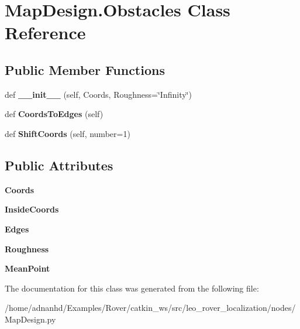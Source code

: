 \hypertarget{classMapDesign_1_1Obstacles}{}\section{Map\+Design.\+Obstacles Class Reference}
\label{classMapDesign_1_1Obstacles}
\subsection*{Public Member Functions}
\begin{DoxyCompactItemize}
\item 
\mbox{\label{classMapDesign_1_1Obstacles_ab1be7e3b82bf7af51c2dfb069f33c824}} 
def {\bfseries \+\_\+\+\_\+init\+\_\+\+\_\+} (self, Coords, Roughness=\char`\"{}Infinity\char`\"{})
\item 
\mbox{\label{classMapDesign_1_1Obstacles_a7d48983e63e4ac175438d21b5e5df722}} 
def {\bfseries Coords\+To\+Edges} (self)
\item 
\mbox{\label{classMapDesign_1_1Obstacles_a62327f4b65d7a5c20b509862ceedd92a}} 
def {\bfseries Shift\+Coords} (self, number=1)
\end{DoxyCompactItemize}
\subsection*{Public Attributes}
\begin{DoxyCompactItemize}
\item 
\mbox{\label{classMapDesign_1_1Obstacles_a7818fce9ea6250a9f319ef99019398cd}} 
{\bfseries Coords}
\item 
\mbox{\label{classMapDesign_1_1Obstacles_aa256d89ec86193cd6257ac407128f130}} 
{\bfseries Inside\+Coords}
\item 
\mbox{\label{classMapDesign_1_1Obstacles_a9ac9628450b43fe32fb70e53590fa160}} 
{\bfseries Edges}
\item 
\mbox{\label{classMapDesign_1_1Obstacles_a10a6682f8b5a18bfe96e4197812b7af4}} 
{\bfseries Roughness}
\item 
\mbox{\label{classMapDesign_1_1Obstacles_a7e8c3de6188ba056265772663bfb7807}} 
{\bfseries Mean\+Point}
\end{DoxyCompactItemize}


The documentation for this class was generated from the following file\+:\begin{DoxyCompactItemize}
\item 
/home/adnanhd/\+Examples/\+Rover/catkin\+\_\+ws/src/leo\+\_\+rover\+\_\+localization/nodes/Map\+Design.\+py\end{DoxyCompactItemize}
